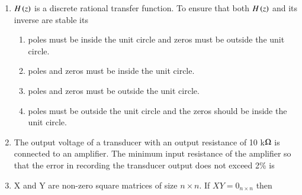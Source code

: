 \documentclass[journal,12pt,onecolumn]{IEEEtran}
\theoremstyle{remark}
\begin{document}
\begin{enumerate}
\hfill{}\begin{enumerate}  
\end{enumerate}

\item $H\left(z\right)$ is a discrete rational transfer function. To ensure that both $H\left(z\right)$ and its inverse are stable its

\hfill{}\begin{enumerate}
    \item poles must be inside the unit circle and zeros must be outside the unit circle.
    \item poles and zeros must be inside the unit circle.
    \item poles and zeros must be outside the unit circle.
    \item poles must be outside the unit circle and the zeros should be inside the unit circle.
 \end{enumerate}



\item The output voltage of a transducer with an output resistance of 10 k$\ohm$ is connected to an amplifier. The minimum input resistance of the amplifier so that the error in recording the transducer output does not exceed 2\% is

\hfill{}
\begin{enumerate}
 \end{enumerate}

\newpage

\item X and Y are non-zero square matrices of size $n \times n$. If $XY=0_{n \times n}$ then

\hfill{}\begin{enumerate}  \end{enumerate}




\end{enumerate}
\end{document}
